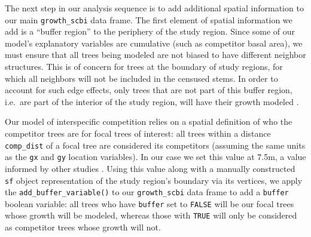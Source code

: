 \documentclass[12pt]{article}
\newenvironment{Shaded}{\begin{snugshade}}{\end{snugshade}}
\newcommand{\CommentTok}[1]{\textcolor[rgb]{0.56,0.35,0.01}{\textit{#1}}}
\newcommand{\DataTypeTok}[1]{\textcolor[rgb]{0.13,0.29,0.53}{#1}}
\newcommand{\DecValTok}[1]{\textcolor[rgb]{0.00,0.00,0.81}{#1}}
\newcommand{\FloatTok}[1]{\textcolor[rgb]{0.00,0.00,0.81}{#1}}
\newcommand{\KeywordTok}[1]{\textcolor[rgb]{0.13,0.29,0.53}{\textbf{#1}}}
\newcommand{\NormalTok}[1]{#1}
\newcommand{\OperatorTok}[1]{\textcolor[rgb]{0.81,0.36,0.00}{\textbf{#1}}}
\newcommand{\StringTok}[1]{\textcolor[rgb]{0.31,0.60,0.02}{#1}}
\begin{document}
The next step in our analysis sequence is to add additional spatial
information to our main \texttt{growth\_scbi} data frame. The first
element of spatial information we add is a ``buffer region'' to the
periphery of the study region. Since some of our model's explanatory
variables are cumulative (such as competitor basal area), we must ensure
that all trees being modeled are not biased to have different neighbor
structures. This is of concern for trees at the boundary of study
regions, for which all neighbors will not be included in the censused
stems. In order to account for such edge effects, only trees that are
not part of this buffer region, i.e.~are part of the interior of the
study region, will have their growth modeled
\citep{waller_applied_2004}.

Our model of interspecific competition relies on a spatial definition of
who the competitor trees are for focal trees of interest: all trees
within a distance \texttt{comp\_dist} of a focal tree are considered its
competitors (assuming the same units as the \texttt{gx} and \texttt{gy}
location variables). In our case we set this value at 7.5m, a value
informed by other studies \citep[\citet{uriarte_spatially_2004},
\citet{canham_neighborhood_2006}]{canham_neighborhood_2004}. Using this
value along with a manually constructed \texttt{sf} object
representation of the study region's boundary via its vertices, we apply
the \texttt{add\_buffer\_variable()} to our \texttt{growth\_scbi} data
frame to add a \texttt{buffer} boolean variable: all trees who have
\texttt{buffer} set to \texttt{FALSE} will be our focal trees whose
growth will be modeled, whereas those with \texttt{TRUE} will only be
considered as competitor trees whose growth will not.

\begin{Shaded}
\end{Shaded}
\end{document}
